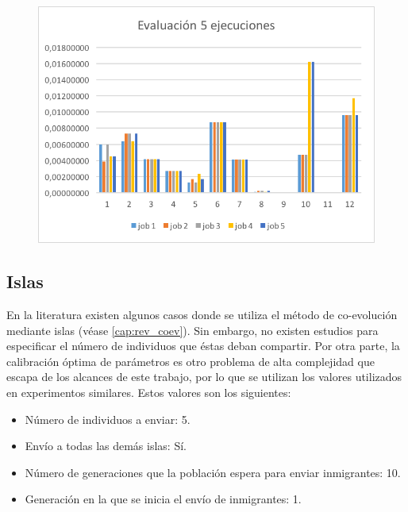 \begin{figure}[H]
    \centering
    \includegraphics[width=14cm]{images/cap3/ejecuciones.png}
    \label{fig:ejecuciones}
\end{figure}

\subsection{Islas}
En la literatura existen algunos casos donde se utiliza el método de co-evolución mediante islas (véase \ref{cap:rev_coev}). Sin embargo, no existen estudios para especificar el número de individuos que éstas deban compartir. Por otra parte, la calibración óptima de parámetros es otro problema de alta complejidad \citep{karafotias_2014, karafotias_2015} que escapa de los alcances de este trabajo, por lo que se utilizan los valores utilizados en experimentos similares. Estos valores son los siguientes:
\begin{itemize}
  \item Número de individuos a enviar: 5.
  \item Envío a todas las demás islas: Sí.
  \item Número de generaciones que la población espera para enviar inmigrantes: 10.
  \item Generación en la que se inicia el envío de inmigrantes: 1.
\end{itemize}
